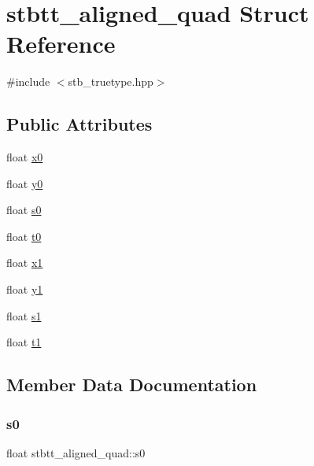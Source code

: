\hypertarget{structstbtt__aligned__quad}{}\section{stbtt\+\_\+aligned\+\_\+quad Struct Reference}
\label{structstbtt__aligned__quad}


{\ttfamily \#include $<$stb\+\_\+truetype.\+hpp$>$}

\subsection*{Public Attributes}
\begin{DoxyCompactItemize}
\item 
float \hyperlink{structstbtt__aligned__quad_ad74fd8fd69f8a8e1bd20cb0ab7df6e2e}{x0}
\item 
float \hyperlink{structstbtt__aligned__quad_a6178a6b380cf6889893afaeb5019ecd6}{y0}
\item 
float \hyperlink{structstbtt__aligned__quad_ac23b153ff4042deb5499e5a8cacf4a59}{s0}
\item 
float \hyperlink{structstbtt__aligned__quad_a921cd13638a8b3a1e0729021d371da49}{t0}
\item 
float \hyperlink{structstbtt__aligned__quad_a43a7eeac24238e289f825e644331dee6}{x1}
\item 
float \hyperlink{structstbtt__aligned__quad_a66ee8061da982804073a3d2a9114e53c}{y1}
\item 
float \hyperlink{structstbtt__aligned__quad_a26360efee3cdfb5aa2bdc593157b436b}{s1}
\item 
float \hyperlink{structstbtt__aligned__quad_ae1f5ed7333ca5bba46c6a098a05ac75b}{t1}
\end{DoxyCompactItemize}


\subsection{Member Data Documentation}
\hypertarget{structstbtt__aligned__quad_ac23b153ff4042deb5499e5a8cacf4a59}{}\label{structstbtt__aligned__quad_ac23b153ff4042deb5499e5a8cacf4a59} 
\subsubsection{\texorpdfstring{s0}{s0}}
{\footnotesize\ttfamily float stbtt\+\_\+aligned\+\_\+quad\+::s0}

